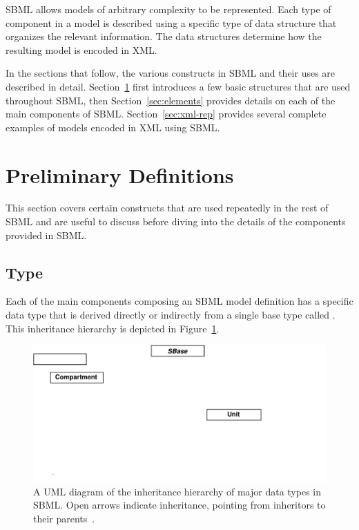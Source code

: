 \documentclass[10pt]{cekarticle}
\newcommand{\vref}[1]{\ref{#1}}
\begin{document}
SBML allows models of arbitrary complexity to be represented.  Each type of
component in a model is described using a specific type of data structure
that organizes the relevant information.  The data structures determine how
the resulting model is encoded in XML.

In the sections that follow, the various constructs in SBML and their uses
are described in detail.  Section~\ref{sec:general} first introduces a few
basic structures that are used throughout SBML, then
Section~\ref{sec:elements} provides details on each of the main components
of SBML.  Section~\ref{sec:xml-rep} provides several complete examples of
models encoded in XML using SBML.


\section{Preliminary Definitions}
\label{sec:general}

This section covers certain constructs that are used repeatedly in the rest
of SBML and are useful to discuss before diving into the details of the
components provided in SBML.

\subsection{Type }
\label{sec:sbase}

Each of the main components composing an SBML model definition has a
specific data type that is derived directly or indirectly from a single
base type called .  This inheritance hierarchy is depicted in
Figure~\vref{fig:top-level}.

\begin{figure}[h]
  \vspace*{8pt}
  \centering
  \includegraphics[scale = 0.7]{top-level}
  \caption{A UML diagram of the inheritance hierarchy of major data types
    in SBML.  Open arrows indicate inheritance, pointing from inheritors to 
    their parents~\citep{eriksson:1998,oestereich:1999}.}
  \label{fig:top-level}
\end{figure}
\end{document}
